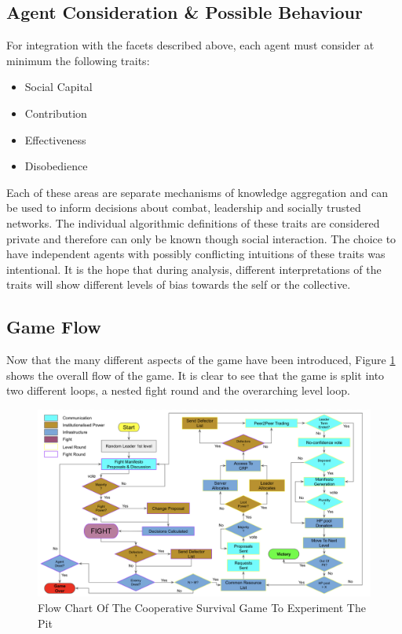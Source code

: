 \subsection{Agent Consideration \& Possible Behaviour}\label{sec: behaviour}


For integration with the facets described above, each agent must consider at minimum the following traits:

\begin{itemize}
    \item Social Capital
    \item Contribution
    \item Effectiveness
    \item Disobedience 
\end{itemize}

Each of these areas are separate mechanisms of knowledge aggregation and can be used to inform decisions about combat, leadership and socially trusted networks. The individual algorithmic definitions of these traits are considered private and therefore can only be known though social interaction. The choice to have independent agents with possibly conflicting intuitions of these traits was intentional. It is the hope that during analysis, different interpretations of the traits will show different levels of bias towards the self or the collective. 


\subsection{Game Flow}\label{sec:game flow}

Now that the many different aspects of the game have been introduced, Figure \ref{fig:game flow} shows the overall flow of the game. It is clear to see that the game is split into two different loops, a nested fight round and the overarching level loop. 

\begin{figure}[htb]
    \centering
    \includegraphics[scale=0.45]{001_game_design/images/gameflow.png}
    \caption{Flow Chart Of The Cooperative Survival Game To Experiment The Pit}
    \label{fig:game flow}
\end{figure}

